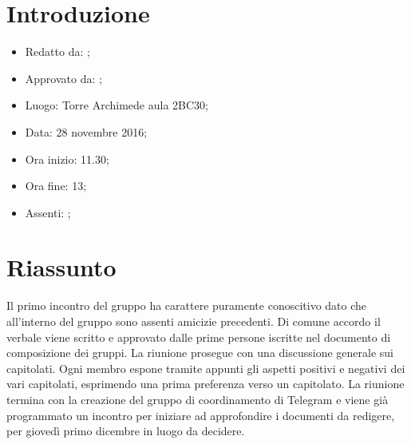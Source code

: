 \section{Introduzione}

	\begin{itemize}
		\item Redatto da: \NS;
		\item Approvato da: \AS;
		\item Luogo: Torre Archimede aula 2BC30;
		\item Data: 28 novembre 2016;
		\item Ora inizio: 11.30;
		\item Ora fine: 13;
		\item Assenti: \AN;		
	\end{itemize}

\section{Riassunto}
Il primo incontro del gruppo ha carattere puramente conoscitivo dato che all’interno del gruppo sono assenti amicizie precedenti. Di comune accordo il verbale viene scritto e approvato dalle prime persone iscritte nel documento di composizione dei gruppi. La riunione prosegue con una discussione generale sui capitolati. Ogni membro espone tramite appunti gli aspetti positivi e negativi dei vari capitolati, esprimendo una prima preferenza verso un capitolato. La riunione termina con la creazione del gruppo di coordinamento di Telegram e viene già programmato un incontro per iniziare ad approfondire i documenti da redigere, per giovedì primo dicembre in luogo da decidere.